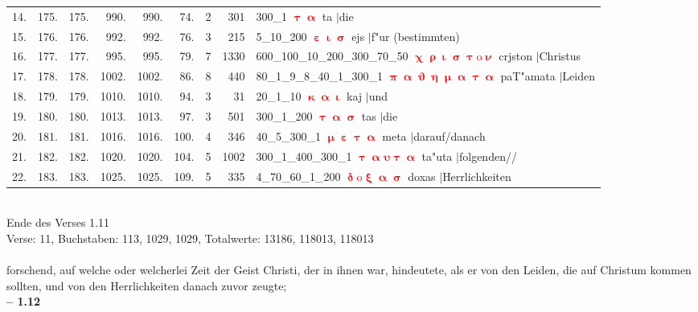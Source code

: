 \documentclass[a4paper,10pt,landscape]{article}
\begin{document}
\begin{tabular}{rrrrrrrrp{120mm}}
14.&175.&175.&990.&990.&74.&2&301&300\_1 \textcolor{red}{$\boldsymbol{\uptau\upalpha}$} ta $|$die\\
15.&176.&176.&992.&992.&76.&3&215&5\_10\_200 \textcolor{red}{$\boldsymbol{\upepsilon\upiota\upsigma}$} ejs $|$f"ur (bestimmten)\\
16.&177.&177.&995.&995.&79.&7&1330&600\_100\_10\_200\_300\_70\_50 \textcolor{red}{$\boldsymbol{\upchi\uprho\upiota\upsigma\uptau\mathrm{o}\upnu}$} crjston $|$Christus\\
17.&178.&178.&1002.&1002.&86.&8&440&80\_1\_9\_8\_40\_1\_300\_1 \textcolor{red}{$\boldsymbol{\uppi\upalpha\upvartheta\upeta\upmu\upalpha\uptau\upalpha}$} paT"amata $|$Leiden\\
18.&179.&179.&1010.&1010.&94.&3&31&20\_1\_10 \textcolor{red}{$\boldsymbol{\upkappa\upalpha\upiota}$} kaj $|$und\\
19.&180.&180.&1013.&1013.&97.&3&501&300\_1\_200 \textcolor{red}{$\boldsymbol{\uptau\upalpha\upsigma}$} tas $|$die\\
20.&181.&181.&1016.&1016.&100.&4&346&40\_5\_300\_1 \textcolor{red}{$\boldsymbol{\upmu\upepsilon\uptau\upalpha}$} meta $|$darauf/danach\\
21.&182.&182.&1020.&1020.&104.&5&1002&300\_1\_400\_300\_1 \textcolor{red}{$\boldsymbol{\uptau\upalpha\upsilon\uptau\upalpha}$} ta"uta $|$folgenden//\\
22.&183.&183.&1025.&1025.&109.&5&335&4\_70\_60\_1\_200 \textcolor{red}{$\boldsymbol{\updelta\mathrm{o}\upxi\upalpha\upsigma}$} doxas $|$Herrlichkeiten\\
\end{tabular}\medskip \\
Ende des Verses 1.11\\
Verse: 11, Buchstaben: 113, 1029, 1029, Totalwerte: 13186, 118013, 118013\\
\\
forschend, auf welche oder welcherlei Zeit der Geist Christi, der in ihnen war, hindeutete, als er von den Leiden, die auf Christum kommen sollten, und von den Herrlichkeiten danach zuvor zeugte;\\
\newpage 
{\bf -- 1.12}\\
\medskip \\
\end{document}
